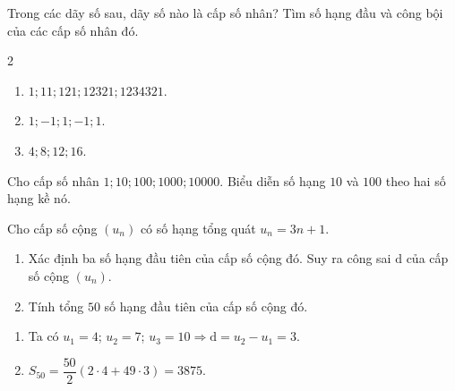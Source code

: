 \begin{vd}%
	Trong các dãy số sau, dãy số nào là cấp số nhân? Tìm số hạng đầu và công bội của các cấp số nhân đó.
	\begin{multicols}{2}
	\begin{enumerate}
	\item $1; 11; 121; 12321; 1234321$.
	\item $1; -1; 1; -1; 1$.
	\item $4; 8; 12; 16$.
	\end{enumerate}
	\end{multicols}
\end{vd}

\begin{vd}%
	Cho cấp số nhân $1; 10; 100; 1000; 10000$. Biểu diễn số hạng $10$ và $100$ theo hai số hạng kề nó.
\end{vd}

\begin{bt}%
    Cho cấp số cộng $\left(u_n\right)$ có số hạng tổng quát $u_n=3 n+1$.
    \begin{enumerate}
        \item Xác định ba số hạng đầu tiên của cấp số cộng đó. Suy ra công sai $\mathrm{d}$ của cấp số cộng $\left(u_n\right)$.
        \item Tính tổng $50$ số hạng đầu tiên của cấp số cộng đó.
    \end{enumerate}
    \loigiai
    {
        \begin{enumerate}
            \item Ta có $
            u_1=4$; $u_2=7$; $u_3=10 \Rightarrow \mathrm{d}=u_2-u_1=3
            $.
            \item $
            S_{50}=\dfrac{50}{2}(2\cdot 4+49\cdot 3)=3875
            $.
        \end{enumerate}
    }
\end{bt}

